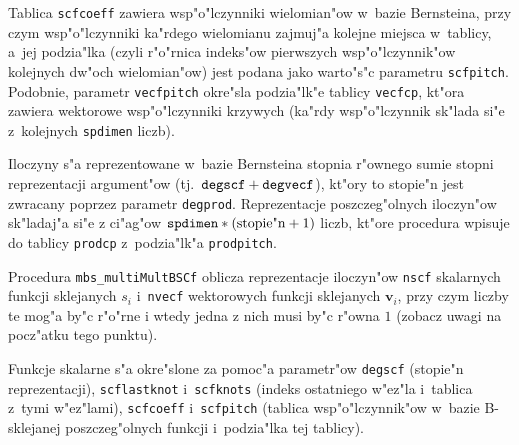 Tablica \texttt{scfcoeff} zawiera wsp"o"lczynniki wielomian"ow w~bazie
Bernsteina, przy czym wsp"o"lczynniki ka"rdego wielomianu zajmuj"a kolejne
miejsca w~tablicy, a~jej podzia"lka (czyli r"o"rnica indeks"ow pierwszych
wsp"o"lczynnik"ow kolejnych dw"och wielomian"ow) jest podana jako warto"s"c
parametru \texttt{scfpitch}. Podobnie, parametr \texttt{vecfpitch} okre"sla
podzia"lk"e tablicy \texttt{vecfcp}, kt"ora zawiera wektorowe
wsp"o"lczynniki krzywych (ka"rdy wsp"o"lczynnik sk"lada si"e z~kolejnych
\texttt{spdimen} liczb).

Iloczyny s"a reprezentowane w~bazie Bernsteina stopnia r"ownego sumie stopni
reprezentacji argument"ow (tj.\
$\mathord{\mbox{\texttt{degscf}}}+\mathord{\mbox{\texttt{degvecf}}}$),
kt"ory to stopie"n jest zwracany poprzez parametr \texttt{degprod}.
Reprezentacje poszczeg"olnych iloczyn"ow sk"ladaj"a si"e z ci"ag"ow
$\mathord{\mbox{\texttt{spdimen}}}*(\mathord{\mbox{stopie"n}}+1)$ liczb,
kt"ore procedura wpisuje do tablicy \texttt{prodcp} z~podzia"lk"a
\texttt{prodpitch}.

\vspace{\bigskipamount}
Procedura \texttt{mbs\_multiMultBSCf} oblicza reprezentacje iloczyn"ow
\texttt{nscf} skalarnych funkcji sklejanych $s_i$ i~\texttt{nvecf}
wektorowych funkcji sklejanych $\bm{v}_i$, przy czym liczby te mog"a by"c
r"o"rne i wtedy jedna z nich musi by"c r"owna $1$ (zobacz uwagi na pocz"atku
tego punktu).

Funkcje skalarne s"a okre"slone za pomoc"a parametr"ow \texttt{degscf}
(stopie"n reprezentacji), \texttt{scflastknot} i~\texttt{scfknots} (indeks
ostatniego w"ez"la i~tablica z~tymi w"ez"lami), \texttt{scfcoeff}
i~\texttt{scfpitch} (tablica wsp"o"lczynnik"ow w~bazie B-sklejanej
poszczeg"olnych funkcji i~podzia"lka tej tablicy).


